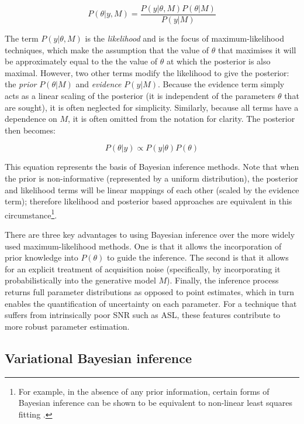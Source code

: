 \documentclass[12pt]{report}
\begin{document}
\begin{equation} 
P(\theta | y, M) = \frac{ P(y | \theta, M) P(\theta | M) }{ P(y | M) }
\end{equation}

The term $P(y|\theta, M)$ is the \textit{likelihood} and is the focus of maximum-likelihood techniques, which make the assumption that the value of $\theta$ that maximises it will be approximately equal to the the value of $\theta$ at which the posterior is also maximal. However, two other terms modify the likelihood to give the posterior: the \textit{prior} $P(\theta | M)$ and \textit{evidence} $P(y | M)$. Because the evidence term simply acts as a linear scaling of the posterior (it is independent of the parameters $\theta$ that are sought), it is often neglected for simplicity. Similarly, because all terms have a dependence on $M$, it is often omitted from the notation for clarity. The posterior then becomes: 

\begin{equation} 
P(\theta | y) \propto P(y | \theta) P(\theta)
\label{eqn_bayes_posterior}
\end{equation}

This equation represents the basis of Bayesian inference methods. Note that when the prior is non-informative (represented by a uniform distribution), the posterior and likelihood terms will be linear mappings of each other (scaled by the evidence term); therefore likelihood and posterior based approaches are equivalent in this circumstance\footnote{For example, in the absence of any prior information, certain forms of Bayesian inference can be shown to be equivalent to non-linear least squares fitting \cite{Chappell2009}.}. 

There are three key advantages to using Bayesian inference over the more widely used maximum-likelihood methods. One is that it allows the incorporation of prior knowledge into $P(\theta)$ to guide the inference. The second is that it allows for an explicit treatment of acquisition noise (specifically, by incorporating it probabilistically into the generative model $M$). Finally, the inference process returns full parameter distributions as opposed to point estimates, which in turn enables the quantification of uncertainty on each parameter. For a technique that suffers from intrinsically poor SNR such as ASL, these features contribute to more robust parameter estimation. 

\subsection{Variational Bayesian inference}
\label{vb_section}
\end{document}

